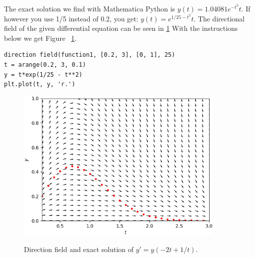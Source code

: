 \begin{Answer}\phantom{}
    	\Question The exact solution we find with \ifmathematica Mathematica \fi \ifpython Python \fi is $y(t) = 1.04081e^{-t^2}t$. If however you use 1/5 instead of 0.2, you get: $y(t) = e^{1/25 - t^2}t$.
    	\Question The directional field of the given differential equation can be seen in \ref{fig:oefening2_1}
    	\Question With the instructions below we get Figure~ \ref{fig:oefening2_1}.

\begin{lstlisting}
direction field(function1, [0.2, 3], [0, 1], 25)
t = arange(0.2, 3, 0.1)
y = t*exp(1/25 - t**2)
plt.plot(t, y, 'r.')
\end{lstlisting}
        
\begin{figure}[H]
	\centering				\includegraphics[width=10cm]{oefening2_1.png}\\
	\caption{Direction field and exact solution of $y' = y(-2t + 1/t)$. \label{fig:oefening2_1}}
\end{figure}
    
    \EndCurrentQuestion
\end{Answer}

